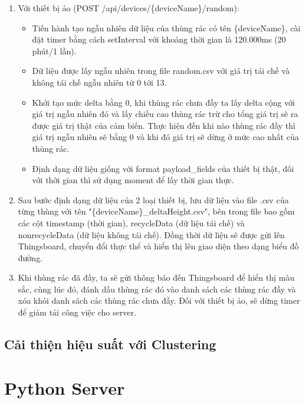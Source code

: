 \begin{itemize}
\begin{itemize}
\begin{enumerate}
\begin{itemize}
            \end{itemize}
            \item Với thiết bị ảo (POST /api/devices/\{deviceName\}/random):
            \begin{itemize}
                \item Tiến hành tạo ngẫu nhiên dữ liệu của thùng rác có tên \{deviceName\}, cài đặt timer bằng cách setInterval với khoảng thời gian là 120.000ms (20 phút/1 lần).
                \item Dữ liệu được lấy ngẫu nhiên trong file random.csv với giá trị tái chế và không tái chế ngẫu nhiên từ 0 tới 13.
                \item Khởi tạo mức delta bằng 0, khi thùng rác chưa đầy ta lấy delta cộng với giá trị ngẫu nhiên đó và lấy chiều cao thùng rác trừ cho tổng giá trị sẽ ra được giá trị thật của cảm biến. Thực hiện đến khi nào thùng rác đầy thì giá trị ngẫu nhiên sẽ bằng 0 và khi đó giá trị sẽ dừng ở mức cao nhất của thùng rác.  
                \item Định dạng dữ liệu giống với format payload\_fields của thiết bị thật, đối với thời gian thì sử dụng moment để lấy thời gian thực. 
            \end{itemize}
            \item Sau bước định dạng dữ liệu của 2 loại thiết bị, lưu dữ liệu vào file .csv của từng thùng với tên "\{deviceName\}\_deltaHeight.csv", bên trong file bao gồm các cột timestamp (thời gian), recycleData (dữ liệu tái chế) và nonrecycleData (dữ liệu không tái chế). Đồng thời dữ liệu sẽ được gửi lên Thingsboard, chuyển đổi thực thể và hiển thị lên giao diện theo dạng biểu đồ đường.
            \item Khi thùng rác đã đầy, ta sẽ gửi thông báo đến Thingsboard để hiển thị màu sắc, cùng lúc đó, đánh dấu thùng rác đó vào danh sách các thùng rác đầy và xóa khỏi danh sách các thùng rác chưa đầy. Đối với thiết bị ảo, sẽ dừng timer để giảm tải công việc cho server.
        \end{enumerate}
    \end{itemize}
\end{itemize}

\subsection{Cải thiện hiệu suất với Clustering}

\section{Python Server}
